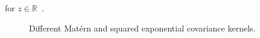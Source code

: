 for \( z \in \mathbb{R} \)~\cite[Eq. 11.4.44]{abramowitz1968handbook}. 
\begin{figure}[ht]
    \centering
    
    \caption{Different Matérn and squared exponential covariance kernels.}
    \label{fig:covariance_kernels_plot}
\end{figure}
% 

